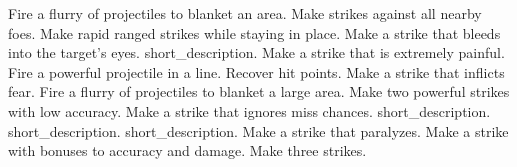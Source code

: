 \begin{spelllist}
 Fire a flurry of projectiles to blanket an area.
 Make strikes against all nearby foes.
 Make rapid ranged strikes while staying in place.
 Make a strike that bleeds into the target's eyes.
 short_description.
 Make a strike that is extremely painful.
 Fire a powerful projectile in a line.
 Recover hit points.
 Make a strike that inflicts fear.
 Fire a flurry of projectiles to blanket a large area.
 Make two powerful strikes with low accuracy.
 Make a strike that ignores miss chances.
 short_description.
 short_description.
 short_description.
 Make a strike that paralyzes.
 Make a strike with bonuses to accuracy and damage.
 Make three strikes.
\end{spelllist}



\small
